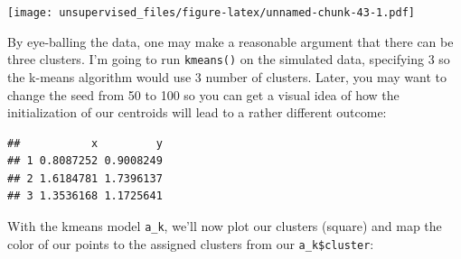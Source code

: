 \documentclass[]{article}
\newenvironment{Shaded}{\begin{snugshade}}{\end{snugshade}}
\newcommand{\DataTypeTok}[1]{\textcolor[rgb]{0.13,0.29,0.53}{#1}}
\newcommand{\DecValTok}[1]{\textcolor[rgb]{0.00,0.00,0.81}{#1}}
\newcommand{\FloatTok}[1]{\textcolor[rgb]{0.00,0.00,0.81}{#1}}
\newcommand{\KeywordTok}[1]{\textcolor[rgb]{0.13,0.29,0.53}{\textbf{#1}}}
\newcommand{\NormalTok}[1]{#1}
\newcommand{\OperatorTok}[1]{\textcolor[rgb]{0.81,0.36,0.00}{\textbf{#1}}}
\newcommand{\StringTok}[1]{\textcolor[rgb]{0.31,0.60,0.02}{#1}}
\begin{document}
\texttt{[image: unsupervised\_files/figure-latex/unnamed-chunk-43-1.pdf]}

By eye-balling the data, one may make a reasonable argument that there
can be three clusters. I'm going to run \texttt{kmeans()} on the
simulated data, specifying 3 so the k-means algorithm would use 3 number
of clusters. Later, you may want to change the seed from 50 to 100 so
you can get a visual idea of how the initialization of our centroids
will lead to a rather different outcome:

\begin{Shaded}
\end{Shaded}

\begin{verbatim}
##           x         y
## 1 0.8087252 0.9008249
## 2 1.6184781 1.7396137
## 3 1.3536168 1.1725641
\end{verbatim}

With the kmeans model \texttt{a\_k}, we'll now plot our clusters
(square) and map the color of our points to the assigned clusters from
our \texttt{a\_k\$cluster}:

\begin{Shaded}
\end{Shaded}
\end{document}
